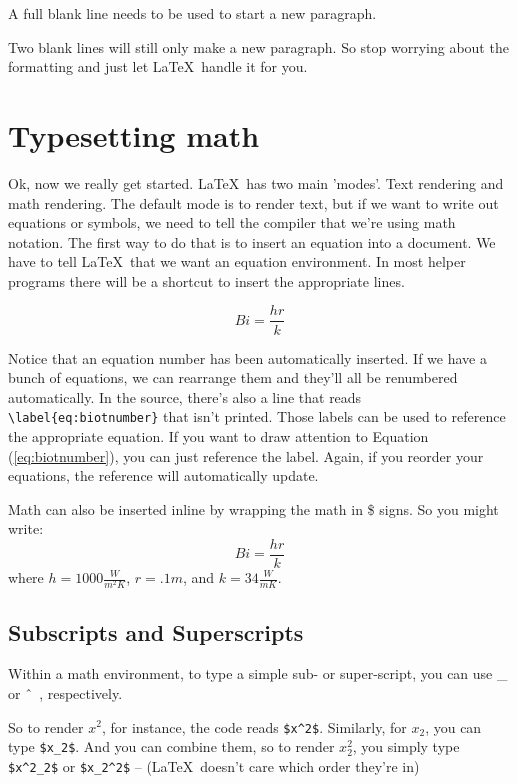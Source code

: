 \documentclass[12pt,a4paper]{article}
\begin{document}
  A full blank line needs to be used to start a new paragraph.  


  Two blank lines will still only make a new paragraph. So stop worrying
  about the formatting and just let \LaTeX\ handle it for you.  

\section{Typesetting math}
  Ok, now we really get started.  \LaTeX\ has two main 'modes'.  Text
  rendering and math rendering.  The default mode is to render text, but
  if we want to write out equations or symbols, we need to tell the
  compiler that we're using math notation.  The first way to do that is
  to insert an equation into a document.
  We have to tell \LaTeX\ that we want an equation environment.  In most
  helper programs there will be a shortcut to insert the appropriate
  lines.  

  \begin{equation}
    Bi = \frac{hr}{k}
    \label{eq:biotnumber}
  \end{equation}

  Notice that an equation number has been automatically inserted.  If we
  have a bunch of equations, we can rearrange them and they'll all be
  renumbered automatically.  In the source, there's also a line that
  reads \verb|\label{eq:biotnumber}| that isn't printed.  Those labels
  can be used to reference the appropriate equation.  If you want to
  draw attention to Equation (\ref{eq:biotnumber}), you can just
  reference the label.  Again, if you reorder your equations, the
  reference will automatically update.  

  Math can also be inserted inline by wrapping the math in \$ signs. So
  you might write: 
  \begin{equation}
    Bi = \frac{hr}{k}
    \label{eq:biotnumber2}
  \end{equation}
  where $h = 1000 \frac{W}{m^2K}$, $r = .1m$, and $k = 34 \frac{W}{m
  K}$.

  \subsection{Subscripts and Superscripts}
  Within a math environment, to type a simple sub- or super-script, you
  can use \_ or \^\ \ ,
  respectively. 

  So to render $x^2$, for instance, the code reads \verb|$x^2$|.  
  Similarly, for $x_2$, you can type \verb|$x_2$|.  And you can combine
  them, so to render $x^2_2$, you simply type \verb|$x^2_2$| or
  \verb|$x_2^2$| -- (\LaTeX\ doesn't care which order they're in)
\end{document}
